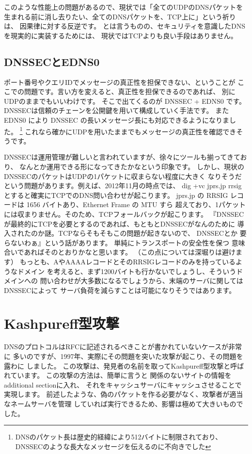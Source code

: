 このような性能上の問題があるので、現状では「全てのUDPのDNSパケットを
生まれる前に消し去りたい、全てのDNSパケットを、TCP上に」という祈りは、
因果律に対する反逆です。
とは言うものの、セキュリティを意識したDNSを現実的に実装するためには、
現状ではTCPよりも良い手段はありません。

\subsection{DNSSECとEDNS0}
ポート番号やクエリIDでメッセージの真正性を担保できない、ということが
ここでの問題です。言い方を変えると、真正性を担保できるのであれば、
別にUDPのままでもいいわけです。
そこで出てくるのが DNSSEC + EDNS0 です。
DNSSECは信頼のチェーンを公開鍵を用いて構成していく手法です。
また EDNS0 により DNSSEC の長いメッセージ長にも対応できるようになりました。
\footnote{DNSのパケット長は歴史的経緯により512バイトに制限されており、
DNSSECのような長大なメッセージを伝えるのに不向きでした}
これなら確かにUDPを用いたままでもメッセージの真正性を確認できそうです。

DNSSECは運用管理が難しいと言われていますが、徐々にツールも揃ってきており、
なんとか運用できる形になってきたかなという印象です。
しかし、現状のDNSSECのパケットはUDPの1パケットに収まらない程度に大きく
なりそうだという問題があります。例えば、2012年11月の時点では、 dig +vc jprs.jp rrsig 
とすると確実にTCPでのDNS問い合わせが起こります。
jprs.jp の RRSIG レコードは 1656 バイトあり、Ethernet Frame の MTU すら
超えており、1パケットには収まりません。そのため、TCPフォールバックが起こります。
『DNSSECが最終的にTCPを必要とするのであれば、もともとDNSSECがなんのために
導入されたのか謎。TCPならそもそもこの問題が起きないので、 DNSSECとか
要らないわぁ』という話があります。 単純にトランスポートの安全性を保つ
意味合いであればそのとおりかなと思います。
（この点については深堀りは避けます）
もっとも、AやAAAAレコードとそのRRSIGレコードのみを持っているようなドメイン
を考えると、まず1200バイトも行かないでしょうし、そういうドメインへの
問い合わせが大多数になるでしょうから、末端のサーバに関してはDNSSECによって
サーバ負荷を減らすことは可能になりそうではあります。


\section{Kashpureff型攻撃}
DNSのプロトコルはRFCに記述されるべきことが書かれていないケースが非常に
多いのですが、1997年、実際にその問題を突いた攻撃が起こり、その問題を露わに
しました。
この攻撃は、発見者の名前を取ってKashpureff型攻撃と呼ばれています。
この攻撃の方法は、簡単に言うと 関係のないサイトの情報をadditional sectionに入れ、
それをキャッシュサーバにキャッシュさせることで実現します。
前述したような、偽のパケットを作る必要がなく、攻撃者が適当なネームサーバを管理
していれば実行できるため、影響は極めて大きいものでした。


